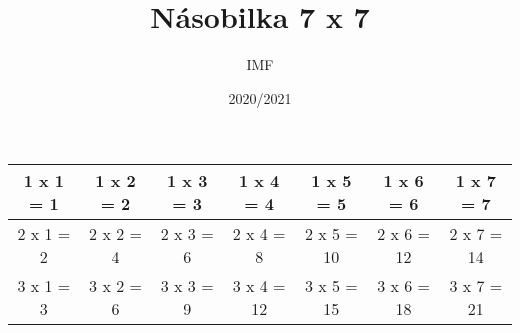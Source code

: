 \documentclass[a4paper,landscape,11pt]{article}
\title{Násobilka 7 x 7}
\author{IMF}
\date{2020/2021}
\begin{document}
\maketitle

\begin{tabular}{|c|c|c|c|c|c|c|}
  \hline
  
  
  1 x 1 = 1
  
  &
  
  
  1 x 2 = 2
  
  &
  
  
  1 x 3 = 3
  
  &
  
  
  1 x 4 = 4
  
  &
  
  
  1 x 5 = 5
  
  &
  
  
  1 x 6 = 6
  
  &
  
  
  1 x 7 = 7
  
  
  \\ \hline
  
  
  2 x 1 = 2
  
  &
  
  
  2 x 2 = 4
  
  &
  
  
  2 x 3 = 6
  
  &
  
  
  2 x 4 = 8
  
  &
  
  
  2 x 5 = 10
  
  &
  
  
  2 x 6 = 12
  
  &
  
  
  2 x 7 = 14
  
  
  \\ \hline
  
  
  3 x 1 = 3
  
  &
  
  
  3 x 2 = 6
  
  &
  
  
  3 x 3 = 9
  
  &
  
  
  3 x 4 = 12
  
  &
  
  
  3 x 5 = 15
  
  &
  
  
  3 x 6 = 18
  
  &
  
  
  3 x 7 = 21
  

\end{tabular}
\end{document}
